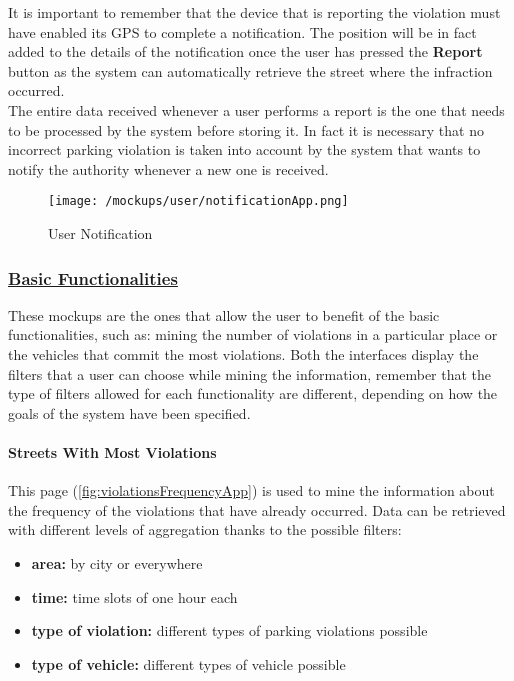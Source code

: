 			It is important to remember that the device that is reporting the violation must have enabled its GPS to complete a notification. The position will be in fact added to the details of the notification once the user has pressed the \textbf{Report} button as the system can automatically retrieve the street where the infraction occurred.\\
			
			The entire data received whenever a user performs a report is the one that needs to be processed by the system before storing it. In fact it is necessary that no incorrect parking violation is taken into account by the system that wants to notify the authority whenever a new one is received.
			
			\begin{figure}[ht!]
				\centering
				\texttt{[image: /mockups/user/notificationApp.png]}
				\caption{\label{fig:notificationApp} User Notification}
			\end{figure}
		
		\subsubsection[Basic Functionalities]{\hyperlink{toc}{Basic Functionalities}}
			\label{sec:userBasicFunctionalities}
			
			These mockups are the ones that allow the user to benefit of the basic functionalities, such as: mining the number of violations in a particular place or the vehicles that commit the most violations. Both the interfaces display the filters that a user can choose while mining the information, remember that the type of filters allowed for each functionality are different, depending on how the goals of the system have been specified.
			
			\paragraph{Streets With Most Violations}
			This page (\autoref{fig:violationsFrequencyApp}) is used to mine the information about the frequency of the violations that have already occurred. Data can be retrieved with different levels of aggregation thanks to the possible filters:
			
			\begin{itemize}
				\item \textbf{area:} by city or everywhere
				\item \textbf{time:} time slots of one hour each
				\item \textbf{type of violation:} different types of parking violations possible
				\item \textbf{type of vehicle:} different types of vehicle possible
			\end{itemize}
		
